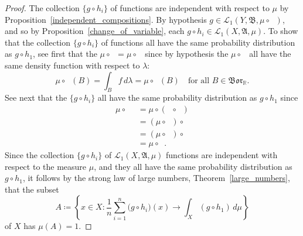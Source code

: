\documentclass[
twoside=true,
paper=letter,
fontsize=9pt,
pagesize=auto,
leqno,
openany,
headsepline,
overfullrule,
]{scrbook}
\theoremstyle{plain}
\theoremstyle{plain}
\theoremstyle{definition}
\theoremstyle{bfnoteitalic}
\theoremstyle{bfnoteroman}
\newcommand{\sigalg}[1]{\mathfrak{#1}}
\newcommand{\cali}[1]{\mathscr{#1}}
\newcommand{\definedby}{\coloneqq}
\newcommand{\borel}{\mathfrak{Bor}}
\newcommand{\preimage}[1]{\mathop{#1^{\leftarrow}}}
\newcommand{\R}{\mathbb{R}}
\newcommand{\sigmaalgebra}{\sigalg{A}}
\newcommand{\sigmaalgebraii}{\sigalg{B}}
\newcommand{\funcg}{g}
\newcommand{\funch}{h}
\newcommand{\function}{f}
\newcommand{\functionii}{g}
\newcommand{\functioniii}{h}
\newcommand{\measurespace}{X}
\newcommand{\measurespaceii}{Y}
\newcommand{\mspaceelt}{x}
\newcommand{\measure}{\mu}
\newcommand{\measmu}{\mu}
\newcommand{\measureiii}{\lambda}
\newcommand{\seti}{A}
\newcommand{\setii}{B}
\begin{document}
\begin{proof}
The collection 
$\{
\funcg\circ\funch_i
\}$
of functions are independent with respect to $\measmu$
by Proposition~\ref{independent_compositions}.
By hypothesis
$\funcg\in
\cali{L}_1(\measurespaceii,\sigmaalgebraii,\measmu\circ\preimage{\funch_i})$,
and so by Proposition~\ref{change_of_variable}, each
$\funcg\circ\funch_i
\in
\cali{L}_1(\measurespace, \sigmaalgebra, \measmu)$.
To show that the collection 
$\{
\functionii\circ\functioniii_i
\}$
of functions all have the same probability distribution as $\functionii\circ\functioniii_1$, 
see first that the 
$\measure\circ \preimage{\functioniii_i} = \measure\circ\preimage{\functioniii_1}$ since by hypothesis the 
$\measure\circ \preimage{\functioniii_i}$ all have the same density function with respect to 
$\measureiii$:
\[
\measure\circ \preimage{\functioniii_i} (\setii) 
=
\int_\setii \function\, d\measureiii
=
\measure\circ \preimage{\functioniii_1} (\setii) 
\quad\text{for all $\setii\in\borel_\R$.}
\]
See next that the $\{
\functionii\circ\functioniii_i
\}$
all have the same probability distribution as $\funcg\circ\funch_1$ since
\begin{align*}
\measure\circ \preimage{(\functionii \circ\functioniii_i)}
& = \measure\circ(\preimage{\functioniii_i}\circ\preimage{\functionii}) \\
& = (\measure\circ\preimage{\functioniii_i})\circ\preimage{\functionii} \\
& = (\measure\circ\preimage{\functioniii_1})\circ\preimage{\functionii} \\
& = \measure\circ \preimage{(\functionii \circ\functioniii_1)}.
\end{align*}
Since the collection 
$\{
\functionii\circ\functioniii_i
\}$
of
$\cali{L}_1(\measurespace, \sigmaalgebra, \measure)$
functions are independent with respect to the measure $\measure$, and they all have the same probability distribution as
$\functionii\circ\functioniii_1$, it follows by the strong law of large numbers, Theorem~\ref{large_numbers}, that the subset 
\[
\seti\definedby
\left\{ 
\mspaceelt\in\measurespace : 
\frac{1}{n} \sum_{i=1}^n \bigl( \functionii\circ \functioniii_i \bigr) (x) \to
\int_\measurespace (\functionii \circ \functioniii_1) \,d\measure 
\right\}
\]
of $\measurespace$ has $\measure(\seti)=1$. 


\end{proof}
\end{document}
